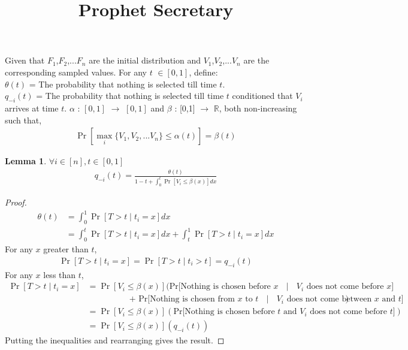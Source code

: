 \documentclass[12pt, letterpaper, twoside]{article}
\title{Prophet Secretary}
\newtheorem{lemma}[theorem]{Lemma}
\begin{document}
	
	\maketitle
	Given that $F_{1}$,$F_{2}$,...$F_{n}$ are the initial distribution and $V_{1}$,$V_{2}$,...$V_{n}$ are the corresponding sampled values. For any $t$ $\in [0,1] $, define:\\
	$\theta(t)$ = The probability that nothing is selected till time $t$.\\
	$q_{-i}(t)$ = The probability that nothing is selected till time $t$ conditioned that $V_{i}$ arrives at time $t$.
	$\alpha$ : $[0,1]$ $\rightarrow$ $[0,1]$ and $\beta$ : [0,1] $\rightarrow$ $\mathbb{R}$, both non-increasing such that,
	\begin{align*}
		\Pr[\max_{i} \{V_{1},V_{2},...V_{n}\} \leq \alpha(t)] = \beta(t)
	\end{align*}
\begin{lemma} $\forall i \in [n], t \in [0,1]$
	\begin{align*}
		q_{-i}(t) = \frac{\theta(t)}{1-t+\int_{0}^{t} \Pr[V_{i} \leq \beta(x)]  dx}
	\end{align*}
\end{lemma}
	\begin{proof}
		\begin{align*}
			\theta(t) &= \int_{0}^{1} \Pr[T > t \mid t_{i} = x] dx\\
			&= \int_{0}^{t} \Pr[T > t \mid t_{i} = x] dx + \int_{t}^{1} \Pr[T > t \mid t_{i} = x] dx
		\end{align*}
		For any $x$ greater than $t$,
		\begin{align*}
			\Pr[T > t \mid t_{i} = x] = \Pr[T > t \mid t_{i} > t] = q_{-i}(t)
		\end{align*}
		For any $x$ less than $t$,
		\begin{align*}
			\Pr[T > t \mid t_{i} = x] &= \Pr[V_{i} \leq \beta(x)] (\text{Pr[Nothing is chosen before $x$ $\mid$ $V_{i}$ does not come before $x$]} \\
			&\quad \quad \quad \quad \quad \text{+ Pr[Nothing is chosen from $x$ to $t$ $\mid$ $V_{i}$ does not come between $x$ and $t$]})\\
			&= \Pr[V_{i} \leq \beta(x)](\text{Pr[Nothing is chosen before $t$ and $V_{i}$ does not come before $t$]})\\
			&= \Pr[V_{i} \leq \beta(x)] (q_{-i}(t))
		\end{align*}
		Putting the inequalities and rearranging gives the result.
	\end{proof}
\end{document}
